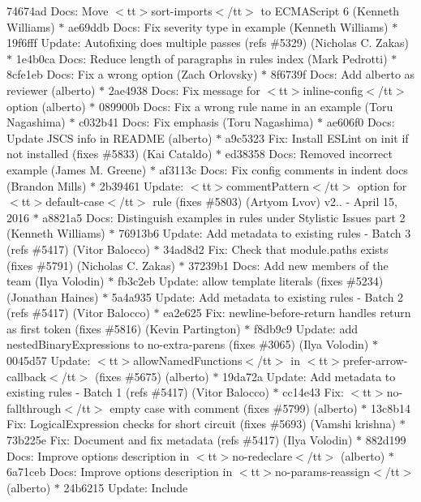 \begin{DoxyItemize}
74674ad Docs\+: Move $<$tt$>$sort-\/imports$<$/tt$>$ to \textquotesingle{}\+ECMAScript 6\textquotesingle{} (\+Kenneth Williams) \texorpdfstring{$\ast$}{*} ae69ddb Docs\+: Fix severity type in example (\+Kenneth Williams) \texorpdfstring{$\ast$}{*} 19f6fff Update\+: Autofixing does multiple passes (refs \#5329) (\+Nicholas C. Zakas) \texorpdfstring{$\ast$}{*} 1e4b0ca Docs\+: Reduce length of paragraphs in rules index (\+Mark Pedrotti) \texorpdfstring{$\ast$}{*} 8cfe1eb Docs\+: Fix a wrong option (\+Zach Orlovsky) \texorpdfstring{$\ast$}{*} 8f6739f Docs\+: Add alberto as reviewer (alberto) \texorpdfstring{$\ast$}{*} 2ae4938 Docs\+: Fix message for $<$tt$>$inline-\/config$<$/tt$>$ option (alberto) \texorpdfstring{$\ast$}{*} 089900b Docs\+: Fix a wrong rule name in an example (\+Toru Nagashima) \texorpdfstring{$\ast$}{*} c032b41 Docs\+: Fix emphasis (\+Toru Nagashima) \texorpdfstring{$\ast$}{*} ae606f0 Docs\+: Update JSCS info in README (alberto) \texorpdfstring{$\ast$}{*} a9c5323 Fix\+: Install ESLint on init if not installed (fixes \#5833) (\+Kai Cataldo) \texorpdfstring{$\ast$}{*} ed38358 Docs\+: Removed incorrect example (\+James M. Greene) \texorpdfstring{$\ast$}{*} af3113c Docs\+: Fix config comments in indent docs (\+Brandon Mills) \texorpdfstring{$\ast$}{*} 2b39461 Update\+: $<$tt$>$comment\+Pattern$<$/tt$>$ option for $<$tt$>$default-\/case$<$/tt$>$ rule (fixes \#5803) (\+Artyom Lvov)  v2.. -\/ April 15, 2016  \texorpdfstring{$\ast$}{*} a8821a5 Docs\+: Distinguish examples in rules under Stylistic Issues part 2 (\+Kenneth Williams) \texorpdfstring{$\ast$}{*} 76913b6 Update\+: Add metadata to existing rules -\/ Batch 3 (refs \#5417) (\+Vitor Balocco) \texorpdfstring{$\ast$}{*} 34ad8d2 Fix\+: Check that module.\+paths exists (fixes \#5791) (\+Nicholas C. Zakas) \texorpdfstring{$\ast$}{*} 37239b1 Docs\+: Add new members of the team (\+Ilya Volodin) \texorpdfstring{$\ast$}{*} fb3c2eb Update\+: allow template literals (fixes \#5234) (\+Jonathan Haines) \texorpdfstring{$\ast$}{*} 5a4a935 Update\+: Add metadata to existing rules -\/ Batch 2 (refs \#5417) (\+Vitor Balocco) \texorpdfstring{$\ast$}{*} ea2e625 Fix\+: newline-\/before-\/return handles return as first token (fixes \#5816) (\+Kevin Partington) \texorpdfstring{$\ast$}{*} f8db9c9 Update\+: add nested\+Binary\+Expressions to no-\/extra-\/parens (fixes \#3065) (\+Ilya Volodin) \texorpdfstring{$\ast$}{*} 0045d57 Update\+: $<$tt$>$allow\+Named\+Functions$<$/tt$>$ in $<$tt$>$prefer-\/arrow-\/callback$<$/tt$>$ (fixes \#5675) (alberto) \texorpdfstring{$\ast$}{*} 19da72a Update\+: Add metadata to existing rules -\/ Batch 1 (refs \#5417) (\+Vitor Balocco) \texorpdfstring{$\ast$}{*} cc14e43 Fix\+: $<$tt$>$no-\/fallthrough$<$/tt$>$ empty case with comment (fixes \#5799) (alberto) \texorpdfstring{$\ast$}{*} 13c8b14 Fix\+: Logical\+Expression checks for short circuit (fixes \#5693) (\+Vamshi krishna) \texorpdfstring{$\ast$}{*} 73b225e Fix\+: Document and fix metadata (refs \#5417) (\+Ilya Volodin) \texorpdfstring{$\ast$}{*} 882d199 Docs\+: Improve options description in $<$tt$>$no-\/redeclare$<$/tt$>$ (alberto) \texorpdfstring{$\ast$}{*} 6a71ceb Docs\+: Improve options description in $<$tt$>$no-\/params-\/reassign$<$/tt$>$ (alberto) \texorpdfstring{$\ast$}{*} 24b6215 Update\+: Include 
\end{DoxyItemize}

